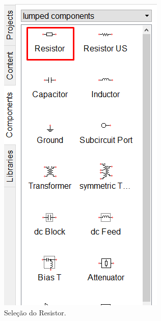 \begin{figure}[H]
    \begin{subfigure}{.4\textwidth}
        \centering
        \includegraphics[width=.7\textwidth,  trim={0 7cm 0 0}, clip]{imagens/CircuitoA/resistor.png}
        \caption{Seleção do Resistor.}
        \label{fig:sel_res}
    \end{subfigure}
    \begin{subfigure}{.4\textwidth}
        \centering

\end{subfigure}
\end{figure}
